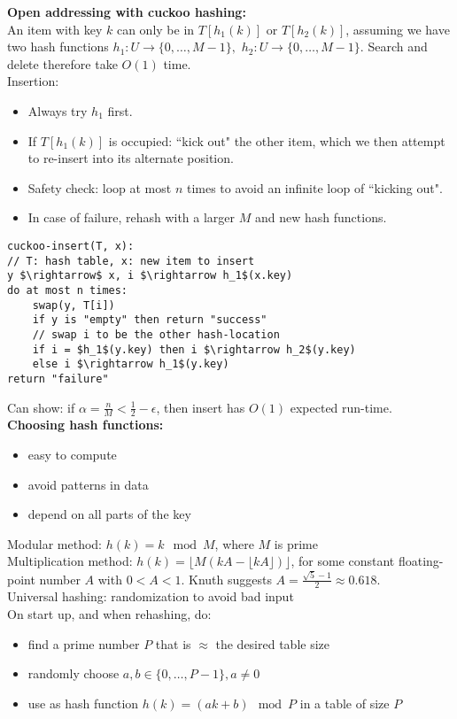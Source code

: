 \documentclass[12pt]{article}
\begin{document}
{\textbf{Open addressing with cuckoo hashing:}\\
An item with key $k$ can only be in $T[h_1(k)]$ or $T[h_2(k)]$, assuming we have two hash functions $h_1: U \rightarrow \{0,\dots, M-1  \}, $ $h_2: U \rightarrow \{0,\dots, M-1  \}$. Search and delete therefore take $O(1)$ time. \\
Insertion:
\begin{itemize}
	\renewcommand\labelitemi{--}
	\item Always try $h_1$ first.
	\item If $T[h_1(k)]$ is occupied: ``kick out" the other item, which we then attempt to re-insert into its alternate position. 
	\item Safety check: loop at most $n$ times to avoid an infinite loop of ``kicking out".
	\item In case of failure, rehash with a larger $M$ and new hash functions.
\end{itemize}
\begin{lstlisting}[mathescape=true]
cuckoo-insert(T, x):
// T: hash table, x: new item to insert
y $\rightarrow$ x, i $\rightarrow h_1$(x.key)
do at most n times:
	swap(y, T[i])
	if y is "empty" then return "success"
	// swap i to be the other hash-location
	if i = $h_1$(y.key) then i $\rightarrow h_2$(y.key)
	else i $\rightarrow h_1$(y.key)
return "failure"
\end{lstlisting}

Can show: if $\alpha = \frac{n}{M} < \frac{1}{2} - \epsilon$, then insert has $O(1)$ expected run-time. \\

\textbf{Choosing hash functions:}
\begin{itemize}
	\renewcommand\labelitemi{--}
	\item easy to compute
	\item avoid patterns in data
	\item depend on all parts of the key
\end{itemize}
Modular method: $h(k) = k \mod M$, where $M$ is prime\\
Multiplication method: $h(k) = \lfloor M(kA - \lfloor kA\rfloor)\rfloor$, for some constant floating-point number $A$ with $0< A < 1$. Knuth suggests $A = \frac{\sqrt{5}-1}{2} \approx 0.618$.\\

Universal hashing: randomization to avoid bad input\\
On start up, and when rehashing, do:
\begin{itemize}
	\renewcommand\labelitemi{--}
	\item find a prime number $P$ that is $\approx$ the desired table size
	\item randomly choose $a, b\in \{0,\dots, P-1 \}, a\ne 0$
	\item use as hash function $h(k) = (ak+b) \mod P$ in a table of size $P$
\end{itemize}

}
\end{document}
